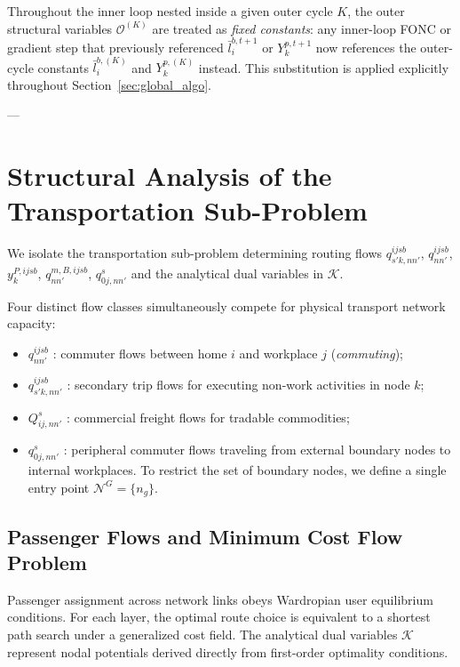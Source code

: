 \documentclass[11pt,a4paper]{article}
\begin{document}
Throughout the inner loop nested inside a given outer cycle $K$, the outer structural variables $\mathcal{O}^{(K)}$ are treated as \emph{fixed constants}: any inner-loop FONC or gradient step that previously referenced $\bar l_i^{b,t+1}$ or $Y_k^{p,t+1}$ now references the outer-cycle constants $\bar l_i^{b,(K)}$ and $Y_k^{p,(K)}$ instead. This substitution is applied explicitly throughout Section~\ref{sec:global_algo}.

---

\section{Structural Analysis of the Transportation Sub-Problem}

We isolate the transportation sub-problem determining routing flows $q^{ijsb}_{s'k, nn'}$, $q^{ijsb}_{nn'}$, $y_k^{P,ijsb}$, $q^{m,B,ijsb}_{nn'}$, $q^s_{0j, nn'}$ and the analytical dual variables in $\mathcal{K}$.

Four distinct flow classes simultaneously compete for physical transport network capacity:
\begin{itemize}
    \item $q^{ijsb}_{nn'}$ : commuter flows between home $i$ and workplace $j$ (\textit{commuting});
    \item $q^{ijsb}_{s'k, nn'}$ : secondary trip flows for executing non-work activities in node $k$;
    \item $Q_{ij, nn'}^s$ : commercial freight flows for tradable commodities;
    \item $q_{0j, nn'}^s$ : peripheral commuter flows traveling from external boundary nodes to internal workplaces. To restrict the set of boundary nodes, we define a single entry point $\mathcal{N}^G = \{n_g\}$.
\end{itemize}

\subsection{Passenger Flows and Minimum Cost Flow Problem}

Passenger assignment across network links obeys Wardropian user equilibrium conditions. For each layer, the optimal route choice is equivalent to a shortest path search under a generalized cost field. The analytical dual variables $\mathcal{K}$ represent nodal potentials derived directly from first-order optimality conditions.
\end{document}
